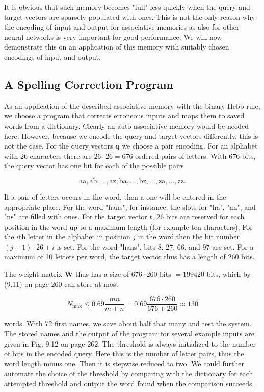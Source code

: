 \documentclass[10pt]{book}
\begin{document}
It is obvious that such memory becomes "full" less quickly when the query and target vectors are sparsely populated with ones. This is not the only reason why the encoding of input and output for associative memories-as also for other neural networks-is very important for good performance. We will now demonstrate this on an application of this memory with suitably chosen encodings of input and output.

\subsection{A Spelling Correction Program}
As an application of the described associative memory with the binary Hebb rule, we choose a program that corrects erroneous inputs and maps them to saved words from a dictionary. Clearly an auto-associative memory would be needed here. However, because we encode the query and target vectors differently, this is not the case. For the query vectors $\boldsymbol{q}$ we choose a pair encoding. For an alphabet with 26 characters there are $26 \cdot 26=676$ ordered pairs of letters. With 676 bits, the query vector has one bit for each of the possible pairs

$$
\mathrm{aa}, \mathrm{ab}, \ldots, \mathrm{az}, \mathrm{ba}, \ldots, \mathrm{bz}, \ldots, \mathrm{za}, \ldots, \mathrm{zz} .
$$

If a pair of letters occurs in the word, then a one will be entered in the appropriate place. For the word "hans", for instance, the slots for "ha", "an", and "ns" are filled with ones. For the target vector $t$, 26 bits are reserved for each position in the word up to a maximum length (for example ten characters). For the $i$th letter in the alphabet in position $j$ in the word then the bit number $(j-1) \cdot 26+i$ is set. For the word "hans", bits 8, 27, 66, and 97 are set. For a maximum of 10 letters per word, the target vector thus has a length of 260 bits.

The weight matrix $\boldsymbol{W}$ thus has a size of $676 \cdot 260$ bits $=199420$ bits, which by (9.11) on page 260 can store at most

$$
N_{\max } \leq 0.69 \frac{m n}{m+n}=0.69 \frac{676 \cdot 260}{676+260} \approx 130
$$

words. With 72 first names, we save about half that many and test the system. The stored names and the output of the program for several example inputs are given in Fig. 9.12 on page 262. The threshold is always initialized to the number of bits in the encoded query. Here this is the number of letter pairs, thus the word length minus one. Then it is stepwise reduced to two. We could further automate the choice of the threshold by comparing with the dictionary for each attempted threshold and output the word found when the comparison succeeds.
\end{document}
